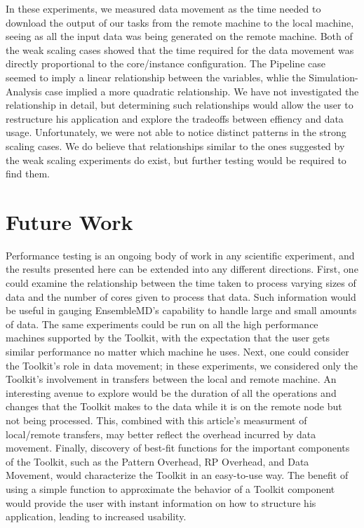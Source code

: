 \documentclass[]{article}
\begin{document}
    In these experiments, we measured data movement as the time needed to download the output of our tasks from the remote machine to the local machine, seeing as all the input data was being generated on the remote machine. Both of the weak scaling cases showed that the time required for the data movement was directly proportional to the core/instance configuration. The Pipeline case seemed to imply a linear relationship between the variables, whlie the Simulation-Analysis case implied a more quadratic relationship. We have not investigated the relationship in detail, but determining such relationships would allow the user to restructure his application and explore the tradeoffs between effiency and data usage. Unfortunately, we were not able to notice distinct patterns in the strong scaling cases. We do believe that relationships similar to the ones suggested by the weak scaling experiments do exist, but further testing would be required to find them.

\section{Future Work}
	Performance testing is an ongoing body of work in any scientific experiment, and the results presented here can be extended into any different directions. First, one could examine the relationship between the time taken to process varying sizes of data and the number of cores given to process that data. Such information would be useful in gauging EnsembleMD’s capability to handle large and small amounts of data. The same experiments could be run on all the high performance machines supported by the Toolkit, with the expectation that the user gets similar performance no matter which machine he uses. Next, one could consider the Toolkit’s role in data movement; in these experiments, we considered only the Toolkit’s involvement in transfers between the local and remote machine. An interesting avenue to explore would be the duration of all the operations and changes that the Toolkit makes to the data while it is on the remote node but not being processed. This, combined with this article’s measurment of local/remote transfers, may better reflect the overhead incurred by data movement. Finally, discovery of best-fit functions for the important components of the Toolkit, such as the Pattern Overhead, RP Overhead, and Data Movement, would characterize the Toolkit in an easy-to-use way. The benefit of using a simple function to approximate the behavior of a Toolkit component would provide the user with instant information on how to structure his application, leading to increased usability.
\end{document}
